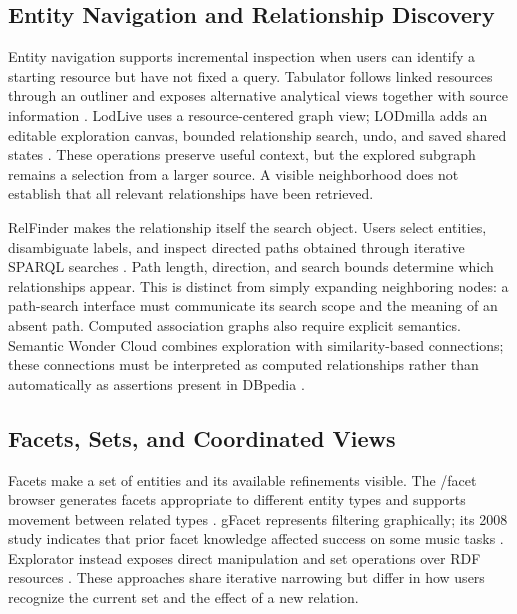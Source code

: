 \documentclass[manuscript,review,screen]{acmart}
\begin{document}
\subsection{Entity Navigation and Relationship Discovery}
Entity navigation supports incremental inspection when users can identify a starting resource but have not fixed a query. Tabulator follows linked resources through an outliner and exposes alternative analytical views together with source information \citep{2006_Berners-Lee_Tabulator_Exploring}. LodLive uses a resource-centered graph view; LODmilla adds an editable exploration canvas, bounded relationship search, undo, and saved shared states \citep{2012_Camarda_LodLive_exploring,2014_AMA_LODmilla_Shared}. These operations preserve useful context, but the explored subgraph remains a selection from a larger source. A visible neighborhood does not establish that all relevant relationships have been retrieved.

RelFinder makes the relationship itself the search object. Users select entities, disambiguate labels, and inspect directed paths obtained through iterative SPARQL searches \citep{2009_Heim_RelFinder_Revealing}. Path length, direction, and search bounds determine which relationships appear. This is distinct from simply expanding neighboring nodes: a path-search interface must communicate its search scope and the meaning of an absent path. Computed association graphs also require explicit semantics. Semantic Wonder Cloud combines exploration with similarity-based connections; these connections must be interpreted as computed relationships rather than automatically as assertions present in DBpedia \citep{V3-02469}.

\subsection{Facets, Sets, and Coordinated Views}
Facets make a set of entities and its available refinements visible. The /facet browser generates facets appropriate to different entity types and supports movement between related types \citep{2006_Hildebrand_facet_A}. gFacet represents filtering graphically; its 2008 study indicates that prior facet knowledge affected success on some music tasks \citep{2008_Heim_gFacet_A}. Explorator instead exposes direct manipulation and set operations over RDF resources \citep{2009_Araujo_Experimenting_with}. These approaches share iterative narrowing but differ in how users recognize the current set and the effect of a new relation.
\end{document}
